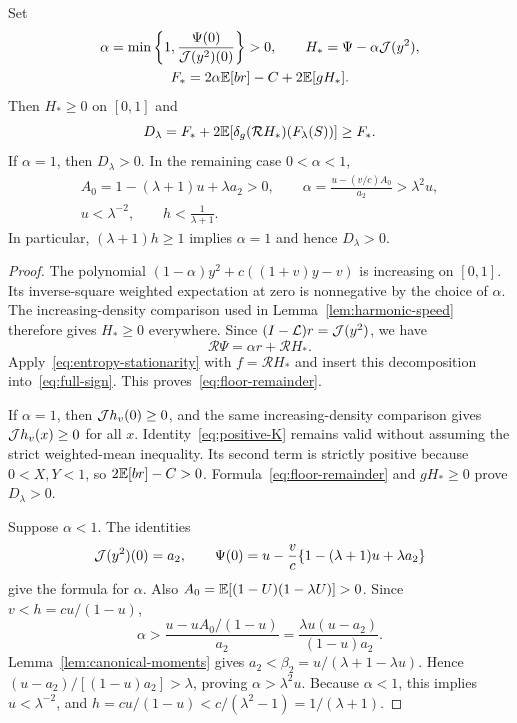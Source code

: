 \begin{lemma}\label{lem:calibration}
Set
\begin{equation}\label{eq:calibrated-floor}
 \begin{gathered}
 \alpha=\min\left\{1,\frac{\Psi(0)}{\mathcal J(y^2)(0)}\right\}>0,
 \qquad H_* =\Psi-\alpha\mathcal J(y^2),\\
 F_* =2\alpha\mathbb E[br]-C+2\mathbb E[gH_*].
 \end{gathered}
\end{equation}
Then $H_*\ge0$ on $[0,1]$ and
\begin{equation}\label{eq:floor-remainder}
 D_\lambda=F_*+2\mathbb E[\delta_g(\mathcal RH_*)(F_\lambda(S))]\ge F_*.
\end{equation}
If $\alpha=1$, then $D_\lambda>0$. In the remaining case $0<\alpha<1$,
\begin{equation}\label{eq:hard-calibration}
 \begin{gathered}
 A_0=1-(\lambda+1)u+\lambda a_2>0,\qquad
 \alpha=\frac{u-(v/c)A_0}{a_2}>\lambda^2u,\\
 u<\lambda^{-2},\qquad h<\frac1{\lambda+1}.
 \end{gathered}
\end{equation}
In particular, $(\lambda+1)h\ge1$ implies $\alpha=1$ and hence $D_\lambda>0$.
\end{lemma}
\begin{proof}
The polynomial $(1-\alpha)y^2+c((1+v)y-v)$ is increasing on $[0,1]$. Its inverse-square weighted expectation at zero is nonnegative by the choice of $\alpha$. The increasing-density comparison used in Lemma~\ref{lem:harmonic-speed} therefore gives $H_*\ge0$ everywhere. Since $(I-\mathcal L)r=\mathcal J(y^2)$, we have
\[
 \mathcal R\Psi=\alpha r+\mathcal RH_*.
\]
Apply~\eqref{eq:entropy-stationarity} with $f=\mathcal RH_*$ and insert this decomposition into~\eqref{eq:full-sign}. This proves~\eqref{eq:floor-remainder}.

If $\alpha=1$, then $\mathcal J h_v(0)\ge0$, and the same increasing-density comparison gives $\mathcal J h_v(x)\ge0$ for all $x$. Identity~\eqref{eq:positive-K} remains valid without assuming the strict weighted-mean inequality. Its second term is strictly positive because $0<X,Y<1$, so $2\mathbb E[br]-C>0$. Formula~\eqref{eq:floor-remainder} and $gH_*\ge0$ prove $D_\lambda>0$.

Suppose $\alpha<1$. The identities
\[
 \mathcal J(y^2)(0)=a_2,\qquad
 \Psi(0)=u-\frac vc\{1-(\lambda+1)u+\lambda a_2\}
\]
give the formula for $\alpha$. Also $A_0=\mathbb E[(1-U)(1-\lambda U)]>0$. Since $v<h=cu/(1-u)$,
\[
 \alpha>
 \frac{u-uA_0/(1-u)}{a_2}
 =\frac{\lambda u(u-a_2)}{(1-u)a_2}.
\]
Lemma~\ref{lem:canonical-moments} gives
$a_2<\beta_2=u/(\lambda+1-\lambda u)$. Hence
$(u-a_2)/[(1-u)a_2]>\lambda$, proving $\alpha>\lambda^2u$. Because $\alpha<1$, this implies $u<\lambda^{-2}$, and $h=cu/(1-u)<c/(\lambda^2-1)=1/(\lambda+1)$.
\end{proof}

